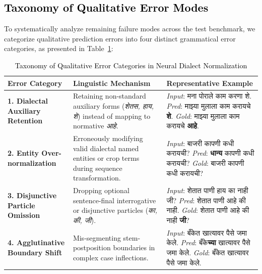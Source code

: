 \subsection{\textcolor{black}{Taxonomy of Qualitative Error Modes}}

To systematically analyze remaining failure modes across the test benchmark, we categorize qualitative prediction errors into four distinct grammatical error categories, as presented in Table~\ref{tab:error_taxonomy}:

\begin{table}[t]
\color{black}
\centering
\caption{\textcolor{black}{Taxonomy of Qualitative Error Categories in Neural Dialect Normalization}}
\label{tab:error_taxonomy}
\begin{tabularx}{\textwidth}{lXX}
\hline
\textbf{Error Category} & \textbf{Linguistic Mechanism} & \textbf{Representative Example} \\
\hline
\textbf{1. Dialectal Auxiliary Retention} & Retaining non-standard auxiliary forms (\emph{शेतस, हाय, शे}) instead of mapping to normative \emph{आहे}. & \textit{Input}: मना पोराले काम करणा शे. \newline \textit{Pred}: माझ्या मुलाला काम करायचे \textbf{शे}. \newline \textit{Gold}: माझ्या मुलाला काम करायचे \textbf{आहे}. \\
\hline
\textbf{2. Entity Over-normalization} & Erroneously modifying valid dialectal named entities or crop terms during sequence transformation. & \textit{Input}: बाजरी कापणी कधी करायची? \newline \textit{Pred}: \textbf{धान्य} कापणी कधी करायची? \newline \textit{Gold}: बाजरी कापणी कधी करायची? \\
\hline
\textbf{3. Disjunctive Particle Omission} & Dropping optional sentence-final interrogative or disjunctive particles (\emph{का, की, जी}). & \textit{Input}: शेतात पाणी हाय का नाही जी? \newline \textit{Pred}: शेतात पाणी आहे की नाही. \newline \textit{Gold}: शेतात पाणी आहे की नाही \textbf{जी}? \\
\hline
\textbf{4. Agglutinative Boundary Shift} & Mis-segmenting stem-postposition boundaries in complex case inflections. & \textit{Input}: बँकेत खात्यावर पैसे जमा केले. \newline \textit{Pred}: बँके\textbf{च्या} खात्यावर पैसे जमा केले. \newline \textit{Gold}: बँकेत खात्यावर पैसे जमा केले. \\
\hline
\end{tabularx}
\end{table}

